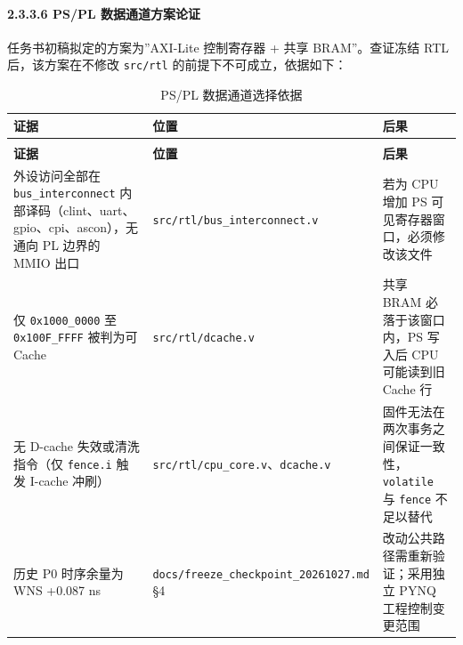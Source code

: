 
\Needspace{85pt}

\paragraph{2.3.3.6 PS/PL 数据通道方案论证}\label{pspl-ux6570ux636eux901aux9053ux65b9ux6848ux8bbaux8bc1}

任务书初稿拟定的方案为''AXI-Lite 控制寄存器 + 共享 BRAM''。查证冻结 RTL 后，该方案在不修改 \texttt{src/\allowbreak{}rtl} 的前提下不可成立，依据如下：

{\small
\renewcommand{\thetable}{2-10}
\begin{longtable}{@{}>{\raggedright\arraybackslash}p{}>{\raggedright\arraybackslash}p{}>{\raggedright\arraybackslash}p{}@{}}
\caption{PS/PL 数据通道选择依据}\label{tab:2-10}\\
\toprule
\textbf{证据} & \textbf{位置} & \textbf{后果} \\
\midrule
\endfirsthead
\multicolumn{3}{@{}l}{\footnotesize 续表 2-10}\\
\toprule
\textbf{证据} & \textbf{位置} & \textbf{后果} \\
\midrule
\endhead
外设访问全部在 \texttt{bus\_\allowbreak{}\allowbreak{}interconnect} 内部译码（clint、uart、gpio、cpi、ascon），无通向 PL 边界的 MMIO 出口 & \texttt{src/\allowbreak{}rtl/\allowbreak{}bus\_\allowbreak{}\allowbreak{}interconnect.\allowbreak{}v} & 若为 CPU 增加 PS 可见寄存器窗口，必须修改该文件 \\
仅 \texttt{0x1000\_\allowbreak{}\allowbreak{}0000} 至 \texttt{0x100F\_\allowbreak{}\allowbreak{}FFFF} 被判为可 Cache & \texttt{src/\allowbreak{}rtl/\allowbreak{}dcache.\allowbreak{}v} & 共享 BRAM 必落于该窗口内，PS 写入后 CPU 可能读到旧 Cache 行 \\
无 D-cache 失效或清洗指令（仅 \texttt{fence.\allowbreak{}i} 触发 I-cache 冲刷） & \texttt{src/\allowbreak{}rtl/\allowbreak{}cpu\_\allowbreak{}\allowbreak{}core.\allowbreak{}v}、\texttt{dcache.\allowbreak{}v} & 固件无法在两次事务之间保证一致性，\texttt{volatile} 与 \texttt{fence} 不足以替代 \\
历史 P0 时序余量为 WNS +0.087 ns & \texttt{docs/\allowbreak{}freeze\_\allowbreak{}\allowbreak{}checkpoint\_\allowbreak{}\allowbreak{}20261027.\allowbreak{}md} §4 & 改动公共路径需重新验证；采用独立 PYNQ 工程控制变更范围 \\
\bottomrule
\end{longtable}
}


